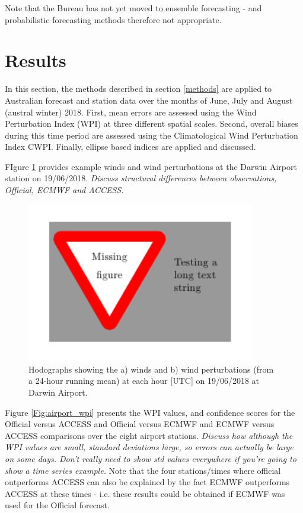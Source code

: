 \documentclass[alpha-refs]{wiley-article}
\begin{document}
Note that the Bureau has not yet moved to ensemble forecasting - and probabilistic forecasting methods therefore not appropriate. 

\section{Results}
\label{results}
In this section, the methods described in section \ref{methods} are applied to Australian forecast and station data over the months of June, July and August (austral winter) 2018. First, mean errors are assessed using the Wind Perturbation Index (WPI) at three different spatial scales. Second, overall biases during this time period are assessed using the Climatological Wind Perturbation Index CWPI. Finally, ellipse based indices are applied and discussed.

FIgure \ref{Fig:darwin_airport_winds} provides example winds and wind perturbations at the Darwin Airport station on 19/06/2018. \textit{Discuss structural differences between observations, Official, ECMWF and ACCESS.} 
\begin{figure}
\centering
\includegraphics[keepaspectratio=true, height=7cm]{figure_placeholder.png}
\caption{Hodographs showing the a) winds and b) wind perturbations (from a 24-hour running mean) at each hour [UTC] on 19/06/2018 at Darwin Airport.}
\label{Fig:darwin_airport_winds}
\end{figure}

Figure \ref{Fig:airport_wpi} presents the WPI values, and confidence scores for the Official versus ACCESS and Official versus ECMWF and ECMWF versus ACCESS comparisons over the eight airport stations. \textit{Discuss how although the WPI values are small, standard deviations large, so errors can actually be large on some days. Don't really need to show std values everywhere if you're going to show a time series example.} Note that the four stations/times where official outperforms ACCESS can also be explained by the fact ECMWF outperforms ACCESS at these times - i.e. these results could be obtained if ECMWF was used for the Official forecast.
\end{document}
